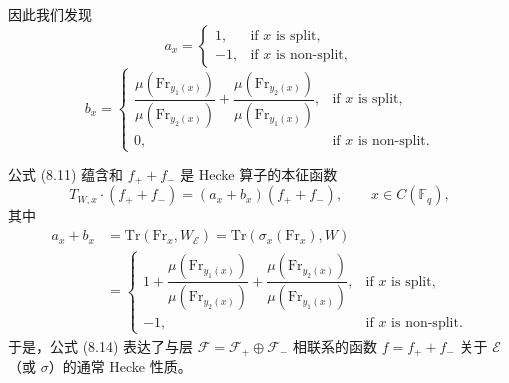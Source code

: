 \documentclass[11pt,a4paper]{article}
\begin{document}
因此我们发现
\begin{equation}\tag{8.12}
a_x = \begin{cases} 1, & \text{if } x \text{ is split},\\ -1, & \text{if } x \text{ is non-split},\end{cases}
\end{equation}
\begin{equation}\tag{8.13}
b_x = \begin{cases} \dfrac{\mu(\mathrm{Fr}_{y_1(x)})}{\mu(\mathrm{Fr}_{y_2(x)})} + \dfrac{\mu(\mathrm{Fr}_{y_2(x)})}{\mu(\mathrm{Fr}_{y_1(x)})}, & \text{if } x \text{ is split},\\[10pt] 0, & \text{if } x \text{ is non-split}.\end{cases}
\end{equation}


公式 (8.11) 蕴含和 $f_+ + f_-$ 是 Hecke 算子的本征函数
\begin{equation}\tag{8.14}
T_{W,x}\cdot (f_+ + f_-) = (a_x + b_x)(f_+ + f_-), \qquad x\in C(\mathbb{F}_q),
\end{equation}
其中
\begin{equation}\tag{8.15}
\begin{aligned}
a_x + b_x &= \mathrm{Tr}(\mathrm{Fr}_x, W_{\mathcal{E}}) = \mathrm{Tr}(\sigma_x(\mathrm{Fr}_x), W)\\
&= \begin{cases} 1 + \dfrac{\mu(\mathrm{Fr}_{y_1(x)})}{\mu(\mathrm{Fr}_{y_2(x)})} + \dfrac{\mu(\mathrm{Fr}_{y_2(x)})}{\mu(\mathrm{Fr}_{y_1(x)})}, & \text{if } x \text{ is split},\\[10pt] -1, & \text{if } x \text{ is non-split}.\end{cases}
\end{aligned}
\end{equation}
于是，公式 (8.14) 表达了与层 $\mathcal{F} = \mathcal{F}_+ \oplus \mathcal{F}_-$ 相联系的函数 $f = f_+ + f_-$ 关于 $\mathcal{E}$（或 $\sigma$）的通常 Hecke 性质。
\end{document}
